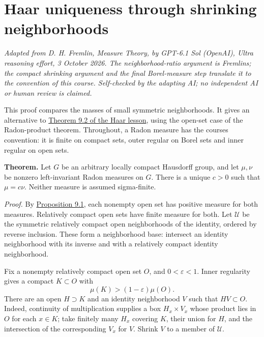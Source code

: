 \documentclass[
  english,
  11pt,
  a4paper,
]{article}
\newcounter{none} %
\begin{document}
\section{Haar uniqueness through shrinking
neighborhoods}\label{fremlin-neighbourhood-uniqueness}

\emph{Adapted from D. H. Fremlin, Measure Theory, by GPT-6.1 Sol
(OpenAI), Ultra reasoning effort, 3 October 2026. The neighborhood-ratio
argument is Fremlin\textquotesingle s; the compact shrinking argument
and the final Borel-measure step translate it to the convention of this
course. Self-checked by the adapting AI; no independent AI or human
review is claimed.}

This proof compares the masses of small symmetric neighborhoods. It
gives an alternative to
\hyperlink{haar-measure-on-locally-compact-groups--oa-fnd-hm-06}{Theorem
9.2 of the Haar lesson}, using the open-set case of the Radon-product
theorem. Throughout, a Radon measure has the course\textquotesingle s
convention: it is finite on compact sets, outer regular on Borel sets
and inner regular on open sets.

\textbf{Theorem.} Let \(G\) be an arbitrary locally compact Hausdorff
group, and let \(\mu,\nu\) be nonzero left-invariant Radon measures on
\(G\). There is a unique \(c>0\) such that \(\mu=c\nu\). Neither measure
is assumed sigma-finite.

\emph{Proof.} By
\hyperlink{haar-measure-on-locally-compact-groups--oa-fnd-hm-06}{Proposition
9.1}, each nonempty open set has positive measure for both measures.
Relatively compact open sets have finite measure for both. Let
\(\mathcal U\) be the symmetric relatively compact open neighborhoods of
the identity, ordered by reverse inclusion. These form a neighborhood
base: intersect an identity neighborhood with its inverse and with a
relatively compact identity neighborhood.

Fix a nonempty relatively compact open set \(O\), and
\(0<\varepsilon<1\). Inner regularity gives a compact \(K\subset O\)
with \[\mu(K)>(1-\varepsilon)\mu(O).\] There are an open \(H\supset K\)
and an identity neighborhood \(V\) such that \(HV\subset O\). Indeed,
continuity of multiplication supplies a box \(H_x\times V_x\) whose
product lies in \(O\) for each \(x\in K\); take finitely many \(H_x\)
covering \(K\), their union for \(H\), and the intersection of the
corresponding \(V_x\) for \(V\). Shrink \(V\) to a member of
\(\mathcal U\).
\end{document}
